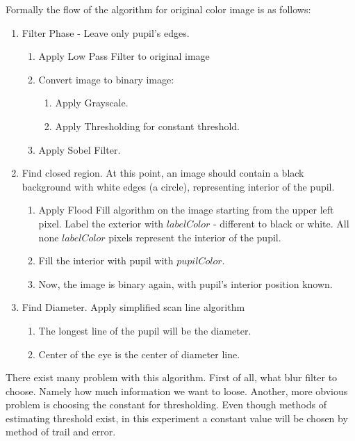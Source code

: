 \documentclass{article}
\begin{document}
Formally the flow of the algorithm for original color image is as follows:

\begin{enumerate}
	\item Filter Phase - Leave only pupil's edges.
	\begin{enumerate}
			\item Apply Low Pass Filter to original image
			\item Convert image to binary image:
				\begin{enumerate}
					\item Apply Grayscale.
					\item Apply Thresholding for constant threshold.
				\end{enumerate}
			\item Apply Sobel Filter.
	\end{enumerate}
	\item Find closed region. At this point, an image should contain a black background with white edges (a circle), representing interior of the pupil.
	\begin{enumerate}
		\item Apply Flood Fill algorithm on the image starting from the upper left pixel. Label the exterior with $labelColor$ - different to black or white. All none $labelColor$ pixels represent the interior of the pupil.
		\item Fill the interior with pupil with $pupilColor$.
		\item Now, the image is binary again, with pupil's interior position known.
	\end{enumerate}
	\item Find Diameter. Apply simplified scan line algorithm
	\begin{enumerate}
		\item The longest line of the pupil will be the diameter.
		\item Center of the eye is the center of diameter line.
	\end{enumerate}
\end{enumerate}

There exist many problem with this algorithm. First of all, what blur filter to choose. Namely how much information we want to loose. Another, more obvious problem is choosing the constant for thresholding. Even though methods of estimating  threshold exist, in this experiment a constant value will be chosen by method of trail and error.

\end{document}
